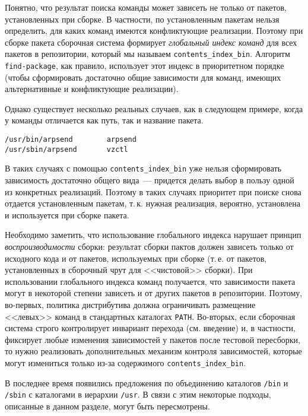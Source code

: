 \documentclass[russian,a4paper,12pt,titlepage]{article}
\begin{document}
Понятно, что результат поиска команды может зависеть не только от пакетов, установленных при сборке.  В частности,
по установленным пакетам нельзя определить, для каких команд имеются конфликтующие реализации.  Поэтому при сборке
пакета сборочная система формирует \textit{глобальный индекс команд} для всех пакетов в репозитории, который
мы называем \verb|contents_index_bin|.  Алгоритм \verb|find-package|, как правило, использует этот индекс в приоритетном
порядке (чтобы сформировать достаточно общие зависимости для команд, имеющих альтернативные и конфликтующие реализации).

Однако существует несколько реальных случаев, как в следующем примере, когда у команды отличается как путь, так и название
пакета.
\begin{verbatim}
/usr/bin/arpsend        arpsend
/usr/sbin/arpsend       vzctl
\end{verbatim}
В таких случаях с помощью \verb|contents_index_bin| уже нельзя сформировать зависимость достаточно общего вида~---
придется делать выбор в пользу одной из конкретных реализаций.  Поэтому в таких случаях приоритет при поиске снова
отдается установленным пакетам, т.\,к. нужная реализация, вероятно, установлена и используется при сборке пакета.

Необходимо заметить, что использование глобального индекса нарушает принцип \textit{воспроизводимости} сборки:
результат сборки пактов должен зависеть только от исходного кода и от пакетов, используемых при сборке (т.\,е. от пакетов,
установленных в сборочный чрут для <<чистовой>> сборки).  При использовании глобального индекса команд получается,
что зависимости пакета могут в некоторой степени зависеть и от других пакетов в репозитории.  Поэтому, во-первых,
политика дистрибутива должна ограничивать размещение <<левых>> команд в стандартных каталогах \verb|PATH|.  Во-вторых,
если сборочная система строго контролирует инвариант перехода (см. введение) и, в частности, фиксирует любые изменения
зависимостей у пакетов после тестовой пересборки, то нужно реализовать дополнительных механизм контроля зависимостей,
которые могут измениться только из-за содержимого \verb|contents_index_bin|.

В последнее время появились предложения по объединению каталогов \verb|/bin| и \verb|/sbin| с каталогами в иерархии \verb|/usr|.
В связи с этим некоторые подходы, описанные в данном разделе, могут быть пересмотрены.
\pagebreak
\end{document}

